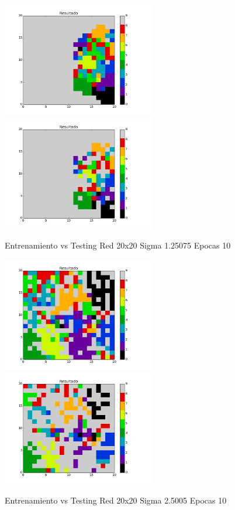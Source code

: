 \includegraphics[width=0.5\textwidth]{img/EJ2_Sigma/train_M_20_sigma_1_25075_epocas_5}
\includegraphics[width=0.5\textwidth]{img/EJ2_Sigma/test_M_20_sigma_1_25075_epocas_5}
{\center \footnotesize Entrenamiento vs Testing Red 20x20 Sigma 1.25075 Epocas 10\par}

\includegraphics[width=0.5\textwidth]{img/EJ2_Sigma/train_M_20_sigma_2_5005_epocas_5}
\includegraphics[width=0.5\textwidth]{img/EJ2_Sigma/test_M_20_sigma_2_5005_epocas_5}
{\center \footnotesize Entrenamiento vs Testing Red 20x20 Sigma 2.5005 Epocas 10\par}

